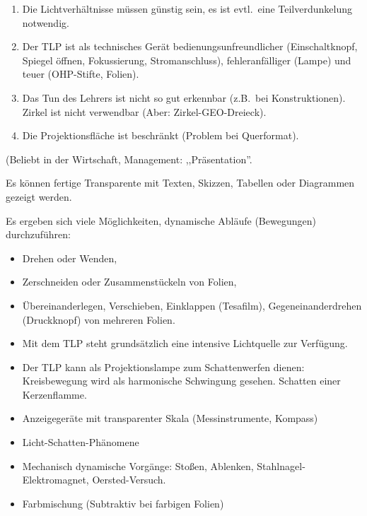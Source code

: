 \begin{enumerate}
\item
Die Lichtverh\"{a}ltnisse m\"{u}ssen g\"{u}nstig sein, es ist evtl.\ eine
Teilverdunkelung notwendig.
\item Der TLP ist als technisches Ger\"{a}t bedienungsunfreundlicher
(Einschaltknopf, Spiegel \"{o}ffnen, Fokussierung, Stromanschluss),
fehleranf\"{a}lliger
(Lampe) und teuer (OHP-Stifte, Folien).
\item
Das Tun des Lehrers ist nicht so gut erkennbar
(z.B.\ bei Konstruktionen).
Zirkel ist nicht verwendbar (Aber: Zirkel-GEO-Dreieck).

\item
Die Projektionsfl\"{a}che ist beschr\"{a}nkt (Problem bei Querformat).
\end{enumerate}

(Beliebt in der Wirtschaft, Management: ,,Pr\"{a}sentation''.

Es k\"{o}nnen fertige Transparente mit Texten, Skizzen, Tabellen oder
Diagrammen gezeigt werden.

\mip
Es ergeben sich viele M\"{o}glichkeiten, dynamische Abl\"{a}ufe (Bewegungen)
durchzuf\"{u}hren:
\begin{itemize}
\item Drehen oder Wenden,
\item Zerschneiden oder Zusammenst\"{u}ckeln von Folien,
\item \"{U}bereinanderlegen, Verschieben, Einklappen (Tesafilm),
Gegeneinanderdrehen (Druckknopf) von mehreren Folien.
\end{itemize}

\begin{itemize}
\item
Mit dem TLP steht grunds\"{a}tzlich eine intensive
Lichtquelle zur Verf\"{u}gung.
\item
Der TLP kann als Projektionslampe zum Schattenwerfen dienen:
Kreisbewegung wird als harmonische Schwingung gesehen.
Schatten einer Kerzenflamme.
\item
Anzeigeger\"{a}te mit transparenter Skala (Messinstrumente, Kompass)
\item
Licht-Schatten-Ph\"{a}nomene
\item
Mechanisch dynamische Vorg\"{a}nge: Sto{\ss}en, Ablenken,
Stahlnagel-Elektromagnet, Oersted-Versuch.
\item
Farbmischung (Subtraktiv bei farbigen Folien)
\end{itemize}


